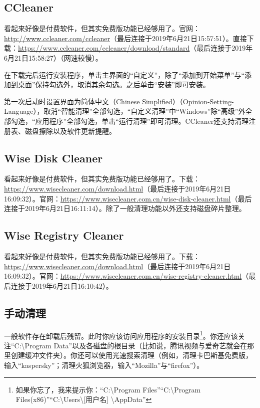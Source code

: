 \subsection{CCleaner}
看起来好像是付费软件，但其实免费版功能已经够用了。官网：\url{http://www.ccleaner.com/ccleaner}（最后连接于2019年6月21日15:57:51）。直接下载：\url{https://www.ccleaner.com/ccleaner/download/standard}（最后连接于2019年6月21日15:58:27）（网速较慢）。\par
在下载完后运行安装程序，单击主界面的“自定义”，除了“添加到开始菜单”与“添加到桌面”保持勾选外，取消其余勾选。之后单击“安装”即可安装。\par
第一次启动时设置界面为简体中文（Chinese Simplified）（Opinion-Setting-Language），取消“智能清理”全部勾选，“自定义清理”中“Windows”除“高级”外全部勾选，“应用程序”全部勾选，单击“运行清理”即可清理。CCleaner还支持清理注册表、磁盘擦除以及软件更新提醒。
\subsection{Wise Disk Cleaner}
看起来好像是付费软件，但其实免费版功能已经够用了。下载：\url{https://www.wisecleaner.com/download.html}（最后连接于2019年6月21日16:09:32）。官网：\url{https://www.wisecleaner.com.cn/wise-disk-cleaner.html}（最后连接于2019年6月21日16:11:14）。除了一般清理功能以外还支持磁盘碎片整理。
\subsection{Wise Registry Cleaner}
看起来好像是付费软件，但其实免费版功能已经够用了。下载：\url{https://www.wisecleaner.com/download.html}（最后连接于2019年6月21日16:09:32）。官网：\url{https://www.wisecleaner.com.cn/wise-registry-cleaner.html}（最后连接于2019年6月21日16:10:42）。
\subsection{手动清理}
一般软件存在卸载后残留。此时你应该访问应用程序的安装目录\footnote{如果你忘了，我来提示你：“C:\textbackslash Program Files”“C:\textbackslash Program Files(x86)”“C:\textbackslash Users\textbackslash [用户名] \textbackslash AppData”}。你还应该关注“C:\textbackslash Program Data”以及各磁盘的根目录（比如说，腾讯视频与爱奇艺就会在那里创建缓冲文件夹）。你还可以使用光速搜索清理（例如，清理卡巴斯基免费版，输入“kaspersky”；清理火狐浏览器，输入“Mozilla”与“firefox”）。{\color{red}{注意！你只应清理你熟知的文件。}}
